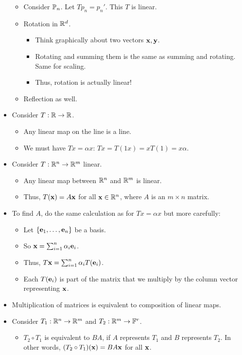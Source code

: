 \documentclass[../../notes.tex]{subfiles}
\begin{document}
\begin{itemize}
\begin{itemize}
        \item Consider $\mathbb{P}_n$. Let $Tp_n=p_n'$. This $T$ is linear.
        \item Rotation in $\mathbb{R}^d$.
        \begin{itemize}
            \item Think graphically about two vectors $\mathbf{x},\mathbf{y}$.
            \item Rotating and summing them is the same as summing and rotating. Same for scaling.
            \item Thus, rotation is actually linear!
        \end{itemize}
        \item Reflection as well.
    \end{itemize}
    \item Consider $T:\mathbb{R}\to\mathbb{R}$.
    \begin{itemize}
        \item Any linear map on the line is a line.
        \item We must have $Tx=\alpha x$: $Tx=T(1x)=xT(1)=x\alpha$.
    \end{itemize}
    \item Consider $T:\mathbb{R}^n\to\mathbb{R}^m$ linear.
    \begin{itemize}
        \item Any linear map between $\mathbb{R}^n$ and $\mathbb{R}^m$ is linear.
        \item Thus, $T(\mathbf{x})=A\mathbf{x}$ for all $\mathbf{x}\in\mathbb{R}^n$, where $A$ is an $m\times n$ matrix.
    \end{itemize}
    \item To find $A$, do the same calculation as for $Tx=\alpha x$ but more carefully:
    \begin{itemize}
        \item Let $\{\mathbf{e}_1,\dots,\mathbf{e}_n\}$ be a basis.
        \item So $\mathbf{x}=\sum_{i=1}^n\alpha_i\mathbf{e}_i$.
        \item Thus, $T\mathbf{x}=\sum_{i=1}^n\alpha_iT(\mathbf{e}_i)$.
        \item Each $T(\mathbf{e}_i)$ is part of the matrix that we multiply by the column vector representing $\mathbf{x}$.
    \end{itemize}
    \item Multiplication of matrices is equivalent to composition of linear maps.
    \item Consider $T_1:\mathbb{R}^n\to\mathbb{R}^m$ and $T_2:\mathbb{R}^m\to\mathbb{F}^r$.
    \begin{itemize}
        \item $T_2\circ T_1$ is equivalent to $BA$, if $A$ represents $T_1$ and $B$ represents $T_2$. In other words, $(T_2\circ T_1)(\mathbf{x})=BA\mathbf{x}$ for all $\mathbf{x}$.

\end{itemize}
\end{itemize}
\end{document}
